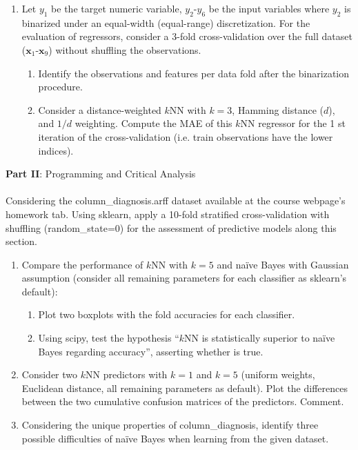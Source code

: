 \documentclass[12pt]{article}
\begin{document}
\begin{enumerate}[leftmargin=\labelsep]
    \item Let $y_1$ be the target numeric variable, $y_2$-$y_6$ be the input variables where $y_2$ is binarized under an
    equal-width (equal-range) discretization. For the evaluation of regressors, consider a 3-fold
    cross-validation over the full dataset ($\mathbf{x}_1$-$\mathbf{x}_9$) without shuffling the observations.

    \begin{enumerate}
        \item Identify the observations and features per data fold after the binarization procedure.
        \item  Consider a distance-weighted $k$NN with $k = 3$, Hamming distance ($d$), and $1/d$ weighting.
        Compute the MAE of this $k$NN regressor for the 1
        st iteration of the cross-validation (i.e. train
        observations have the lower indices).
    \end{enumerate}
\end{enumerate}

\vskip 1cm

\large{\textbf{Part II}: Programming and Critical Analysis}\normalsize

\paragraph{}Considering the column\_diagnosis.arff dataset available at the course webpage’s homework tab.
Using sklearn, apply a 10-fold stratified cross-validation with shuffling (random\_state=0) for the
assessment of predictive models along this section.

\begin{enumerate}[leftmargin=\labelsep]
    \item Compare the performance of $k$NN with $k = 5$ and naïve Bayes with Gaussian assumption
    (consider all remaining parameters for each classifier as sklearn's default):

    \begin{enumerate}
        \item Plot two boxplots with the fold accuracies for each classifier.
        \item Using scipy, test the hypothesis “$k$NN is statistically superior to naïve Bayes regarding
        accuracy”, asserting whether is true.
    \end{enumerate}

    \item Consider two $k$NN predictors with $k = 1$ and $k = 5$ (uniform weights, Euclidean distance,
    all remaining parameters as default). Plot the differences between the two cumulative confusion
    matrices of the predictors. Comment.

    \item Considering the unique properties of column\_diagnosis, identify three possible difficulties
    of naïve Bayes when learning from the given dataset.
\end{enumerate}
\end{document}
